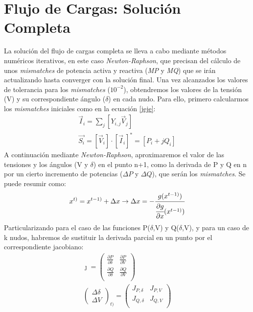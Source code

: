 \documentclass[a4paper,10pt,titlepage,oneside]{article}
\begin{document}
{\section{Flujo de Cargas: Solución Completa}
La solución del flujo de cargas completa se lleva a cabo mediante métodos numéricos iterativos, en este caso \textit{Newton-Raphson}, que precisan del cálculo de unos \textit{mismatches} de potencia activa y reactiva (\textit{MP} y \textit{MQ}) que se irán actualizando hasta converger con la solución final. Una vez alcanzados los valores de tolerancia para los \textit{mismatches} ($10^{-2}$), obtendremos los valores de la tensión (V) y su correspondiente ángulo ($\delta$) en cada nudo.
Para ello, primero calcularmos los \textit{mismatches} iniciales como en la ecuación \ref{jeje}:
\begin{gather}
    \vec{I}_i = \sum_{j} [Y_{i,j}\vec{V}_j] \\
    \vec{S_i} = [\vec{V}_i]\cdot [\vec{I}_i]^* = [P_i+jQ_i]
    \label{jeje}
\end{gather}
A continuación mediante \textit{Newton-Raphson}, aproximaremos el valor de las tensiones y los ángulos (V y $\delta$) en el punto n+1, como la derivada de P y Q en n por un cierto  incremento de potencias ($\Delta P$ y $\Delta Q$), que serán los \textit{mismatches}. Se puede resumir como: 
\begin{equation}
    x^{t)} = x^{t-1)} + \Delta x \rightarrow \Delta x= -\cfrac{g(x^{t-1)})}{\cfrac{\partial g}{\partial x}(x^{t-1)})}
\end{equation}
Particularizando para el caso de las funciones P($\delta$,V) y Q($\delta$,V), y para un caso de k nudos, habremos de sustituir la derivada parcial en un punto por el correspondiente jacobiano:
\begin{gather}
    \jmath = \begin{pmatrix}
   \frac{\partial P}{\partial \delta} & \frac{\partial P}{\partial V}\\
   \frac{\partial Q}{\partial \delta} & \frac{\partial Q}{\partial V}\\
   \end{pmatrix}\\
   \begin{pmatrix}
    \Delta \delta \\ \Delta V
   \end{pmatrix}_{t)} =
   \begin{pmatrix}
   J_{P,\delta} & J_{P,V}\\
   J_{Q,\delta} & J_{Q,V}\\

\end{pmatrix}
\end{gather}}
\end{document}
